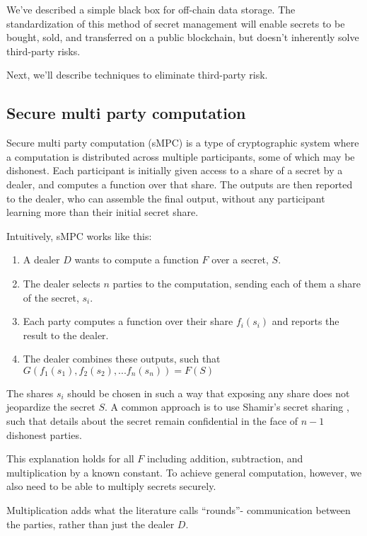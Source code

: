 \documentclass[11pt]{article}
\begin{document}
We've described a simple black box for off-chain data storage. The
standardization of this method of secret management will enable
secrets to be bought, sold, and transferred on a public blockchain,
but doesn't inherently solve third-party risks.

Next, we'll describe techniques to eliminate third-party risk.

\subsection{Secure multi party computation} \label{sMPC}

Secure multi party computation (sMPC) is a type of cryptographic
system where a computation is distributed across multiple
participants, some of which may be dishonest. Each participant is
initially given access to a share of a secret by a dealer, and
computes a function over that share. The outputs are then reported to
the dealer, who can assemble the final output, without any participant
learning more than their initial secret share.

Intuitively, sMPC works like this:

\begin{enumerate}
  \item A dealer $D$ wants to compute a function $F$ over a secret,
      $S$.
  \item The dealer selects $n$ parties to the computation, sending
      each of them a share of the secret, $s_i$.
  \item Each party computes a function over their share $f_i(s_i)$ and
      reports the result to the dealer.
  \item The dealer combines these outputs, such that
      $G(f_1(s_1),f_2(s_2),...f_n(s_n)) = F(S)$
\end{enumerate}

The shares $s_i$ should be chosen in such a way that exposing any
share does not jeopardize the secret $S$. A common approach is to use
Shamir's secret sharing \cite{shamir}, such that details about the
secret remain confidential in the face of $n-1$ dishonest parties.

This explanation holds for all $F$ including addition, subtraction,
and multiplication by a known constant. To achieve general
computation, however, we also need to be able to multiply secrets
securely.

Multiplication adds what the literature calls ``rounds''- communication
between the parties, rather than just the dealer $D$.
\end{document}
